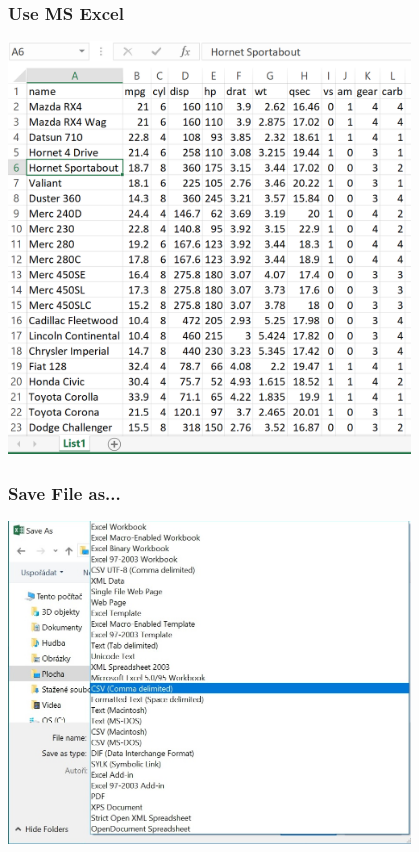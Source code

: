 \documentclass[12pt]{beamer}\usepackage[]{graphicx}\usepackage[]{color}
\begin{document}

\begin{frame}
\frametitle{Use MS Excel}\centering
 \includegraphics[width=0.8\textwidth,height=0.8\textheight,keepaspectratio]{./Images/05_Excel}
\end{frame}


\begin{frame}\centering
\frametitle{Save File as...}
 \includegraphics[width=0.8\textwidth,height=0.8\textheight,keepaspectratio]{./Images/06_saveAS}
\end{frame}

\end{document}
